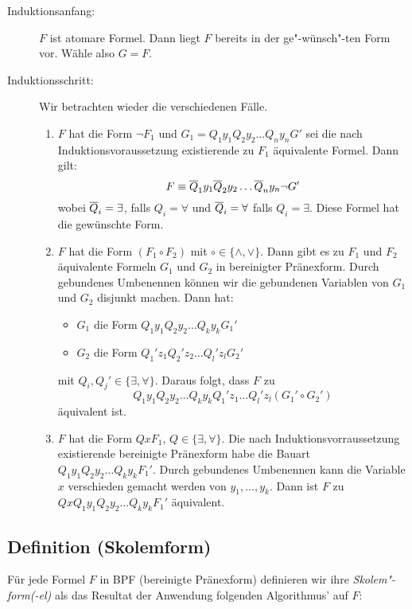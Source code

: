\documentclass[a4paper,twoside,DIV15,BCOR12mm]{scrbook}
\begin{document}
\begin{description}
\item[Induktionsanfang:] $F$ ist atomare Formel. Dann liegt $F$ bereits in der ge"-wünsch"-ten Form vor. Wähle also $G=F$.
\item[Induktionsschritt:] Wir betrachten wieder die verschiedenen Fälle.
	\begin{enumerate}
		\item $F$ hat die Form $\neg F_1$ und $G_1=Q_1y_1Q_2y_2\ldots Q_ny_nG'$ sei die nach Induktionsvoraussetzung existierende
					zu $F_1$ äquivalente Formel. Dann gilt:
					$$F\equiv \overline{Q}_1 y_1 \overline{Q}_2 y_2 \ldots \overline{Q}_n y_n \neg G'$$
					wobei $\overline{Q}_i=\exists$, falls $Q_i=\forall$ und $\overline{Q}_i=\forall$ falls $Q_i=\exists$. Diese Formel hat die gewünschte Form.
		\item $F$ hat die Form $(F_1 \circ F_2)$ mit $\circ\in\{\wedge,\vee\}$. Dann gibt es zu $F_1$ und $F_2$ äquivalente Formeln 
					$G_1$ und $G_2$ in 	bereinigter Pränexform. Durch gebundenes Umbenennen können wir die gebundenen Variablen von $G_1$ 
					und $G_2$ disjunkt machen. Dann hat:
					\begin{itemize}
						\item $G_1$ die Form $Q_1y_1Q_2y_2\ldots Q_ky_kG_1'$
						\item $G_2$ die Form $Q_1'z_1Q_2'z_2\ldots Q_l'z_lG_2'$
					\end{itemize}
					mit $Q_i,Q_j'\in\{\exists,\forall\}$. Daraus folgt, dass $F$ zu 
						$$Q_1y_1Q_2y_2\ldots Q_ky_kQ_1'z_1\ldots Q_l'z_l(G_1'\circ G_2')$$
					äquivalent ist.
		\item $F$ hat die Form $QxF_1$, $Q\in\{\exists,\forall\}$. Die nach Induktionsvorraussetzung existierende bereinigte Pränexform habe die
					Bauart $Q_1y_1Q_2y_2\ldots Q_ky_kF_1'$. Durch gebundenes Umbenennen kann die Variable $x$ verschieden gemacht werden von 
					$y_1,\ldots ,y_k$. Dann ist $F$ zu $QxQ_1y_1Q_2y_2\ldots Q_ky_kF_1'$ äquivalent.
	\end{enumerate}
\end{description}

\subsection{Definition (Skolemform)}

Für jede Formel $F$ in BPF (bereinigte Pränexform) definieren wir ihre \emph{Skolem"-form(-el)} als das Resultat der Anwendung folgenden Algorithmus' auf $F$: 
 
\end{document}
